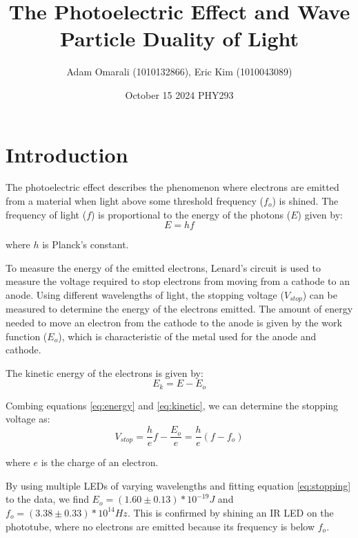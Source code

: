 \documentclass[12pt,twocolumn]{article}
\begin{document}
\vspace{-2cm}
\title{\bf{The Photoelectric Effect and Wave Particle Duality of Light}}
\author{Adam Omarali (1010132866), Eric Kim (1010043089)}
\date{October 15 2024 \linebreak 
PHY293}
\maketitle

\section{Introduction}
The photoelectric effect describes the phenomenon where electrons are emitted from a material when light above some threshold frequency ($f_o$) is shined.
The frequency of light ($f$) is proportional to the energy of the photons ($E$) given by:
\begin{equation}
    E = hf
    \label{eq:energy}
\end{equation}

where $h$ is Planck's constant. 

To measure the energy of the emitted electrons, Lenard's circuit is used to measure the voltage required to stop electrons from moving from a cathode to an anode.
Using different wavelengths of light, the stopping voltage ($V_{stop}$) can be measured to determine the energy of the electrons emitted. The amount of energy needed to move
an electron from the cathode to the anode is given by the work function ($E_o$), which is characteristic of the metal used for the anode and cathode.

The kinetic energy of the electrons is given by:
\begin{equation}
    E_k = E - E_o
    \label{eq:kinetic}
\end{equation}

Combing equations \ref{eq:energy} and \ref{eq:kinetic}, we can determine the stopping voltage as:
\begin{equation}
    V_{stop} = \frac{h}{e}f - \frac{E_o}{e} = \frac{h}{e}(f - f_o)
    \label{eq:stopping}
\end{equation}

where $e$ is the charge of an electron.

By using multiple LEDs of varying wavelengths and fitting equation \ref{eq:stopping} to the data, we find $E_o = (1.60 \pm 0.13)*10^{-19} J$ and
$f_o = (3.38 \pm 0.33)*10^{14}Hz$. This is confirmed by shining an IR LED on the phototube, where no electrons are emitted because its frequency is below $f_o$.
\end{document}
